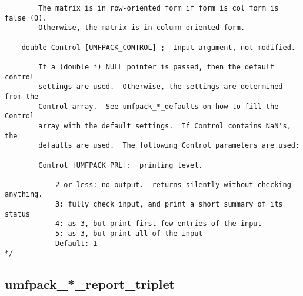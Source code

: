 \documentclass[11pt]{article}
\begin{document}
{\begin{verbatim}
        The matrix is in row-oriented form if form is col_form is false (0).
        Otherwise, the matrix is in column-oriented form.

    double Control [UMFPACK_CONTROL] ;  Input argument, not modified.

        If a (double *) NULL pointer is passed, then the default control
        settings are used.  Otherwise, the settings are determined from the
        Control array.  See umfpack_*_defaults on how to fill the Control
        array with the default settings.  If Control contains NaN's, the
        defaults are used.  The following Control parameters are used:

        Control [UMFPACK_PRL]:  printing level.

            2 or less: no output.  returns silently without checking anything.
            3: fully check input, and print a short summary of its status
            4: as 3, but print first few entries of the input
            5: as 3, but print all of the input
            Default: 1
*/
\end{verbatim}
}


\newpage
\subsection{umfpack\_*\_report\_triplet}
\end{document}
